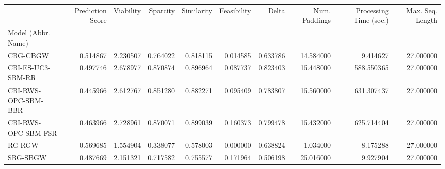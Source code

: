 
\begin{tabular}{lrrrrrrrrr}
 & Prediction Score & Viability & Sparcity & Similarity & Feasibility & Delta & Num. Paddings & Processing Time (sec.) & Max. Seq. Length \\
Model (Abbr. Name) &  &  &  &  &  &  &  &  &  \\
CBG-CBGW & 0.514867 & 2.230507 & 0.764022 & 0.818115 & 0.014585 & 0.633786 & 14.584000 & 9.414627 & 27.000000 \\
CBI-ES-UC3-SBM-RR & 0.497746 & 2.678977 & 0.870874 & 0.896964 & 0.087737 & 0.823403 & 15.448000 & 588.550365 & 27.000000 \\
CBI-RWS-OPC-SBM-BBR & 0.445966 & 2.612767 & 0.851280 & 0.882271 & 0.095409 & 0.783807 & 15.560000 & 631.307437 & 27.000000 \\
CBI-RWS-OPC-SBM-FSR & 0.463966 & 2.728961 & 0.870071 & 0.899039 & 0.160373 & 0.799478 & 15.432000 & 625.714404 & 27.000000 \\
RG-RGW & 0.569685 & 1.554904 & 0.338077 & 0.578003 & 0.000000 & 0.638824 & 1.034000 & 8.175288 & 27.000000 \\
SBG-SBGW & 0.487669 & 2.151321 & 0.717582 & 0.755577 & 0.171964 & 0.506198 & 25.016000 & 9.927904 & 27.000000 \\
\end{tabular}
